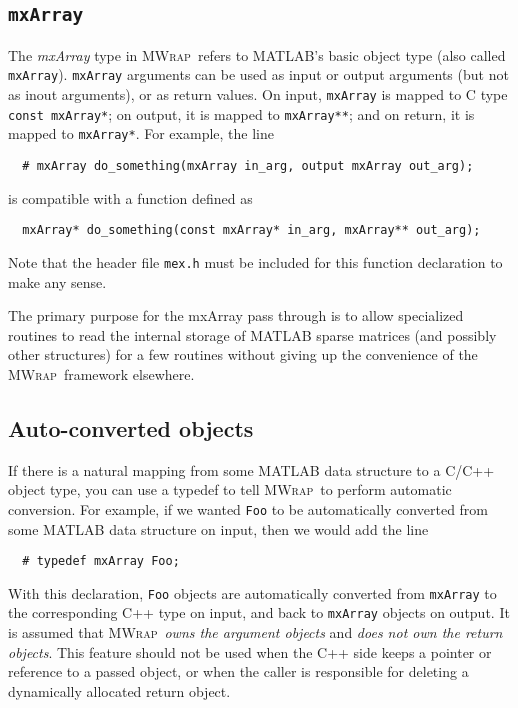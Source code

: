 \documentclass[12pt]{article}
\newcommand{\mwrap}{\textsc{MWrap}}
\begin{document}
\subsection{{\tt mxArray}}

The {\it mxArray} type in \mwrap\ refers to MATLAB's basic
object type (also called {\tt mxArray}).  {\tt mxArray} arguments
can be used as input or output arguments (but not as inout arguments),
or as return values.  On input, {\tt mxArray} is mapped to C type
{\tt const mxArray*}; on output, it is mapped to {\tt mxArray**}; and
on return, it is mapped to {\tt mxArray*}.  For example, the line
\begin{verbatim}
  # mxArray do_something(mxArray in_arg, output mxArray out_arg);
\end{verbatim}
is compatible with a function defined as
\begin{verbatim}
  mxArray* do_something(const mxArray* in_arg, mxArray** out_arg);
\end{verbatim}
Note that the header file {\tt mex.h} must be included for this
function declaration to make any sense.

The primary purpose for the mxArray pass through is to allow
specialized routines to read the internal storage of MATLAB sparse
matrices (and possibly other structures) for a few routines without
giving up the convenience of the \mwrap\ framework elsewhere.


\subsection{Auto-converted objects}

If there is a natural mapping from some MATLAB data structure to
a C/C++ object type, you can use a typedef to tell \mwrap\ to perform
automatic conversion.  For example, if we wanted {\tt Foo} to be
automatically converted from some MATLAB data structure on input, then
we would add the line
\begin{verbatim}
  # typedef mxArray Foo;
\end{verbatim}
With this declaration, {\tt Foo} objects are automatically converted
from {\tt mxArray} to the corresponding C++ type on input, and back to
{\tt mxArray} objects on output.  It is assumed that \mwrap\ {\em owns
the argument objects} and {\em does not own the return objects}.
This feature should not be used when the C++ side keeps a pointer or
reference to a passed object, or when the caller is responsible for deleting
a dynamically allocated return object.
\end{document}
